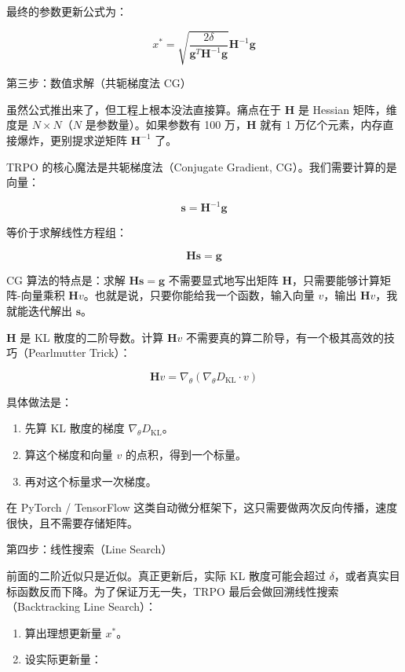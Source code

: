 最终的参数更新公式为：

\[
x^{*}
=
\sqrt{
\frac{2\delta}{\mathbf{g}^{T}\mathbf{H}^{-1}\mathbf{g}}
}
\mathbf{H}^{-1}\mathbf{g}
\]

第三步：数值求解（共轭梯度法 CG）

虽然公式推出来了，但工程上根本没法直接算。痛点在于 \(\mathbf{H}\) 是 Hessian 矩阵，维度是 \(N\times N\)（\(N\) 是参数量）。如果参数有 100 万，\(\mathbf{H}\) 就有 1 万亿个元素，内存直接爆炸，更别提求逆矩阵 \(\mathbf{H}^{-1}\) 了。

TRPO 的核心魔法是共轭梯度法（Conjugate Gradient, CG）。我们需要计算的是向量：

\[
\mathbf{s}=\mathbf{H}^{-1}\mathbf{g}
\]

等价于求解线性方程组：

\[
\mathbf{H}\mathbf{s}=\mathbf{g}
\]

CG 算法的特点是：求解 \(\mathbf{H}\mathbf{s}=\mathbf{g}\) 不需要显式地写出矩阵 \(\mathbf{H}\)，只需要能够计算矩阵-向量乘积 \(\mathbf{H}v\)。也就是说，只要你能给我一个函数，输入向量 \(v\)，输出 \(\mathbf{H}v\)，我就能迭代解出 \(\mathbf{s}\)。

\(\mathbf{H}\) 是 KL 散度的二阶导数。计算 \(\mathbf{H}v\) 不需要真的算二阶导，有一个极其高效的技巧（Pearlmutter Trick）：

\[
\mathbf{H}v
=
\nabla_\theta(\nabla_\theta D_{\mathrm{KL}}\cdot v)
\]

具体做法是：

\begin{enumerate}
\def\labelenumi{\arabic{enumi}.}
\tightlist
\item
  先算 KL 散度的梯度 \(\nabla_\theta D_{\mathrm{KL}}\)。
\item
  算这个梯度和向量 \(v\) 的点积，得到一个标量。
\item
  再对这个标量求一次梯度。
\end{enumerate}

在 PyTorch / TensorFlow 这类自动微分框架下，这只需要做两次反向传播，速度很快，且不需要存储矩阵。

第四步：线性搜索（Line Search）

前面的二阶近似只是近似。真正更新后，实际 KL 散度可能会超过 \(\delta\)，或者真实目标函数反而下降。为了保证万无一失，TRPO 最后会做回溯线性搜索（Backtracking Line Search）：

\begin{enumerate}
\def\labelenumi{\arabic{enumi}.}
\tightlist
\item
  算出理想更新量 \(x^{*}\)。
\item
{}
  设实际更新量：
\end{enumerate}

